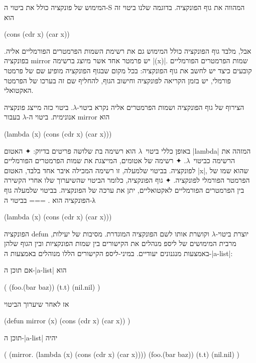 המימוש של פונקציה כולל את ביטוי ה-S המהווה את גוף הפונקציה. בדוגמה שלנו ביטוי
זה הוא
\begin{LISP}
(cons (cdr x) (car x))
\end{LISP}
אבל, מלבד גוף הפונקציה כולל המימוש גם את רשימת השמות הפרמטרים הפורמליים אליה.
בפונקציה mirror יש פרמטר אחד אשר מיוצג ברשימה \T|(x)|. שמות הפרמטרים הפורמליים
קובעים כיצד יש לחשב את גוף הפונקציה: בכל מקום שבגוף הפונקציה מופיע שם של פרמטר
פורמלי, יש בזמן הקריאה לפונקציה וחישוב הגוף, להחליף שם זה בערכו של הפרמטר
האקטואלי.

הצירוף של גוף הפונקציה ושמות הפרמטרים אליה נקרא ביטוי-$λ$. ביטוי כזה
מייצג פונקציה אנונימית. ביטוי ה-$λ$ בעבור mirror הוא
\begin{LISP}
  (lambda (x) (cons (cdr x) (car x)))
\end{LISP}

באופן כללי ביטוי~$λ$ הוא רשימה בת שלושה פריטים בדיוק:
✦ האטום \T|lambda| המזהה את הרשימה כביטוי~$λ$.
✦ רשימה של אטומים, המייצגת את שמות הפרמטרים הפורמליים לפונקציה.
בביטוי שלמעלה, זו רשימה המכילה איבר אחד בלבד, האטום \E|x|, שהוא שמו של הפרמטר הפורמלי לפונקציה.
✦ גוף הפונקציה, כלומר הביטוי שהשיערוך שלו אחרי הקשירה בין הפרמטרים
הפורמליים לאקטואליים, יתן את ערכה של הפונקציה. בביטוי שלמעלה גוף הפונקציה הוא
.
===
בביטוי ה-λ
\begin{LISP}
  (lambda (x) (cons (cdr x) (car x)))
\end{LISP}

הפונקציה defun יוצרת ביטוי-$λ$ וקושרת אותו לשם הפונקציה המוגדרת. מסיבות של
יעילות, מרבית המימושים של ליספ מנהלים את הקישורים בין שמות הפונקציות ובין הגוף
שלהן באמצעות מנגנונים יעודיים. במיני-ליספ הקישורים הללו מנוהלים באמצעות
ה-\E|a-list|:

אם תוכן ה-\E|a-list| הוא
\begin{LISP}
(
  (foo.(bar baz))
  (t.t)
  (nil.nil)
)
\end{LISP}
אז לאחר שיערוך הביטוי
\begin{LISP}
(defun
  mirror (x)
  (cons (cdr x) (car x))
)
\end{LISP}
תוכן ה-\E|a-list| יהיה
\begin{LISP}
(
  (mirror.
     (lambda (x)
        (cons (cdr x) (car x))))
  (foo.(bar baz))
  (t.t)
  (nil.nil)
)
\end{LISP}

